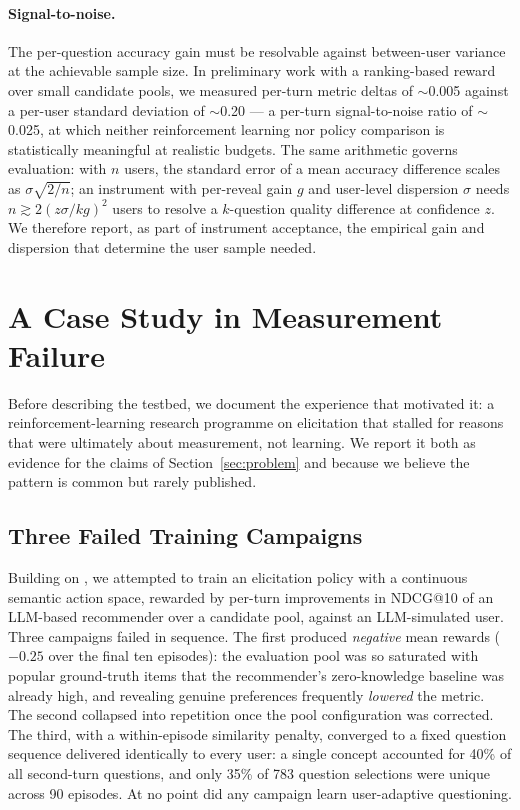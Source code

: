\documentclass[11pt]{article}
\begin{document}
\paragraph{Signal-to-noise.} The per-question accuracy gain must be
resolvable against between-user variance at the achievable sample size. In
preliminary work with a ranking-based reward over small candidate pools, we
measured per-turn metric deltas of $\sim$0.005 against a per-user standard
deviation of $\sim$0.20 --- a per-turn signal-to-noise ratio of
$\sim$0.025, at which neither reinforcement learning nor policy comparison
is statistically meaningful at realistic budgets. The same arithmetic
governs evaluation: with $n$ users, the standard error of a mean accuracy
difference scales as $\sigma\sqrt{2/n}$; an instrument with per-reveal
gain $g$ and user-level dispersion $\sigma$ needs
$n \gtrsim 2(z\sigma / kg)^2$ users to resolve a $k$-question quality
difference at confidence $z$. We therefore report, as part of instrument
acceptance, the empirical gain and dispersion that determine the user
sample needed.

\section{A Case Study in Measurement Failure}
\label{sec:casestudy}

Before describing the testbed, we document the experience that motivated
it: a reinforcement-learning research programme on elicitation that stalled
for reasons that were ultimately about measurement, not learning. We report
it both as evidence for the claims of Section~\ref{sec:problem} and because
we believe the pattern is common but rarely published.

\subsection{Three Failed Training Campaigns}

Building on \citet{makarova2024learning}, we attempted to train an
elicitation policy with a continuous semantic action space, rewarded by
per-turn improvements in NDCG@10 of an LLM-based recommender over a
candidate pool, against an LLM-simulated user. Three campaigns failed in
sequence. The first produced \emph{negative} mean rewards
($-0.25$ over the final ten episodes): the evaluation pool was so saturated
with popular ground-truth items that the recommender's zero-knowledge
baseline was already high, and revealing genuine preferences frequently
\emph{lowered} the metric. The second collapsed into repetition once the
pool configuration was corrected. The third, with a within-episode
similarity penalty, converged to a fixed question sequence delivered
identically to every user: a single concept accounted for 40\% of all
second-turn questions, and only 35\% of 783 question selections were
unique across 90 episodes. At no point did any campaign learn
user-adaptive questioning.
\end{document}
